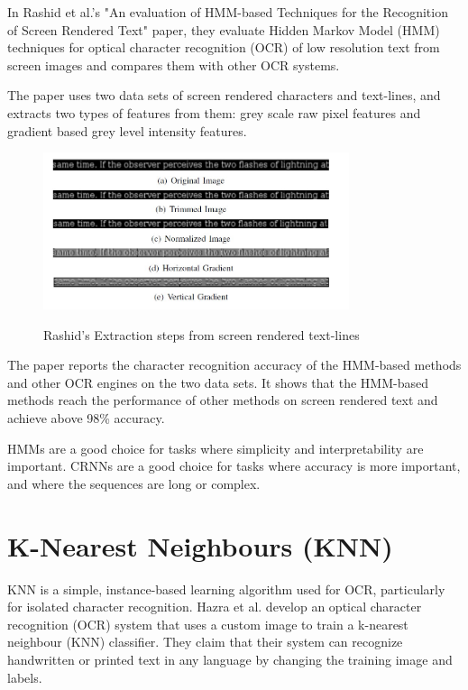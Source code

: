 In Rashid et al.'s "An evaluation of HMM-based Techniques for the Recognition of Screen Rendered Text" paper, they evaluate Hidden Markov Model (HMM) techniques for optical character recognition (OCR) of low resolution text from screen images and compares them with other OCR systems.

The paper uses two data sets of screen rendered characters and text-lines, and extracts two types of features from them: grey scale raw pixel features and gradient based grey level intensity features.


\begin{figure}[!h]
    \centering
    \includegraphics[width=0.8\textwidth]{Figures/HMM_Rashid.jpg}
    \caption[Rashid's Extraction steps from screen rendered text-lines]{Rashid's Extraction steps from screen rendered text-lines}\cite{rashidEvaluationHMMBasedTechniques2011}
    \label{fig:Rashid Feature Extraction Steps}
\end{figure}

The paper reports the character recognition accuracy of the HMM-based methods and other OCR engines on the two data sets. It shows that the HMM-based methods reach the performance of other methods on screen rendered text and achieve above 98\% accuracy.\cite{rashidEvaluationHMMBasedTechniques2011}

HMMs are a good choice for tasks where simplicity and interpretability are important. CRNNs are a good choice for tasks where accuracy is more important, and where the sequences are long or complex.

\newpage

\section{K-Nearest Neighbours (KNN)}

KNN is a simple, instance-based learning algorithm used for OCR, particularly for isolated character recognition. Hazra et al. develop an optical character recognition (OCR) system that uses a custom image to train a k-nearest neighbour (KNN) classifier. They claim that their system can recognize handwritten or printed text in any language by changing the training image and labels. \cite{hazraOpticalCharacterRecognition2017}

